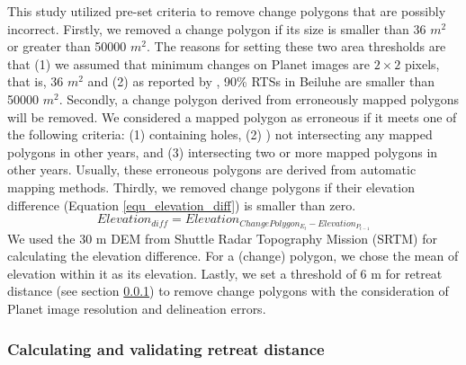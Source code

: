 \documentclass[authoryear,preprint,review,12pt]{elsarticle}
\begin{document}
This study utilized pre-set criteria to remove change polygons that are possibly incorrect. 
Firstly, we removed a change polygon if its size is smaller than 36 $m^2$ or greater than 50000 $m^2$. 
The reasons for setting these two area thresholds are that (1) we assumed that minimum changes on Planet images are $2\times2$ pixels, that is, 36 $m^2$ and (2) as reported by \cite{huang2020using}, 90\% RTSs in Beiluhe are smaller than 50000 $m^2$. 
Secondly, a change polygon derived from erroneously mapped polygons will be removed.
We considered a mapped polygon as erroneous if it meets one of the following criteria: (1) containing holes, (2) ) not intersecting any mapped polygons in other years, and (3) intersecting two or more mapped polygons in other years.
Usually, these erroneous polygons are derived from automatic mapping methods. 
Thirdly, we removed change polygons if their elevation difference (Equation \ref{equ_elevation_diff}) is smaller than zero. 
\begin{equation}
Elevation_{diff}=Elevation_{ChangePolygon_{E_{t}} -  Elevation_{P_{t-1}}}
\label{equ_elevation_diff}
\end{equation}
We used the 30 m DEM from Shuttle Radar Topography Mission (SRTM) \citep{farr2007shuttle} for calculating the elevation difference. 
For a (change) polygon, we chose the mean of elevation within it as its elevation. 
Lastly, we set a threshold of 6 m for retreat distance (see section \ref{sec_cal_retreat_dis}) to remove change polygons with the consideration of Planet image resolution and delineation errors. 


\subsubsection{Calculating and validating retreat distance}
\label{sec_cal_retreat_dis}
\end{document}
